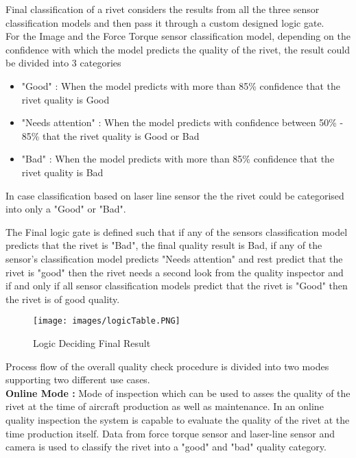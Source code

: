\documentclass{article}
\begin{document}
Final classification of a rivet considers the results from all the three sensor classification models and then pass it through a custom designed logic gate. \\
For the Image and the Force Torque sensor classification model, depending on the confidence with which the model predicts the quality of the rivet, the result could be divided into 3 categories 

\begin{itemize}
    \item "Good" : When the model predicts with more than 85\% confidence that the rivet quality is Good
    \item "Needs attention" :  When the model predicts with confidence between 50\% - 85\% that the rivet quality is Good or Bad
    \item "Bad" : When the model predicts with more than 85\% confidence that the rivet quality is Bad
\end{itemize}

In case classification based on laser line sensor the the rivet could be categorised into only a "Good" or "Bad".

The Final logic gate is defined such that if any of the sensors classification model predicts that the rivet is "Bad", the final quality result is Bad, if any of the sensor's classification model predicts "Needs attention" and rest predict that the rivet is "good" then the rivet needs a second look from the quality inspector and if and only if all sensor classification models predict that the rivet is "Good" then the rivet is of good quality.


\begin{figure}[H]
    \centering
    \texttt{[image: images/logicTable.PNG]}
    \caption{Logic Deciding Final Result}
    \label{fig:finalResultLogic}
\end{figure}


Process flow of the overall quality check procedure is divided into two modes supporting two different use cases.\\


\textbf{Online Mode :} Mode of inspection which can be used to asses the quality of the rivet at the time of aircraft production as well as maintenance. In an online quality inspection the system is capable to evaluate the quality of the rivet at the time production itself. Data from force torque sensor and laser-line sensor and camera is used to classify the rivet into a "good" and "bad" quality category.
\end{document}
